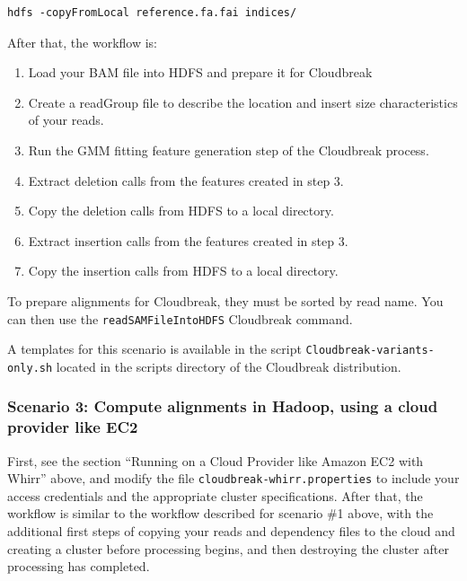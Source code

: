 \documentclass[11pt]{article}
\begin{document}
\begin{verbatim}
hdfs -copyFromLocal reference.fa.fai indices/
\end{verbatim}

After that, the workflow is:

\begin{enumerate}
\item Load your BAM file into HDFS and prepare it for Cloudbreak

\item Create a readGroup file to describe the location and insert size characteristics of your reads.

\item Run the GMM fitting feature generation step of the Cloudbreak process.

\item Extract deletion calls from the features created in step 3.

\item Copy the deletion calls from HDFS to a local directory.

\item Extract insertion calls from the features created in step 3.

\item Copy the insertion calls from HDFS to a local directory.

\end{enumerate}

To prepare alignments for Cloudbreak, they must be sorted by read name. You can then use the
 \texttt{readSAMFileIntoHDFS} Cloudbreak command.

A templates for this scenario is available in the script \texttt{Cloudbreak-variants-only.sh}
located in the scripts directory of the Cloudbreak distribution.

\subsubsection{Scenario 3: Compute alignments in Hadoop, using a cloud provider like EC2}
\label{scenario3:computealignmentsinhadoopusingacloudproviderlikeec2}

First, see the section ``Running on a Cloud Provider like Amazon EC2 with Whirr'' above, and modify the file
\texttt{cloudbreak-whirr.properties} to include your access credentials and the appropriate cluster
specifications. After that, the workflow is similar to the workflow described for scenario \#1
above, with the additional first steps of copying your reads and dependency files to the cloud and
creating a cluster before processing begins, and then destroying the cluster after processing has
completed.
\end{document}
